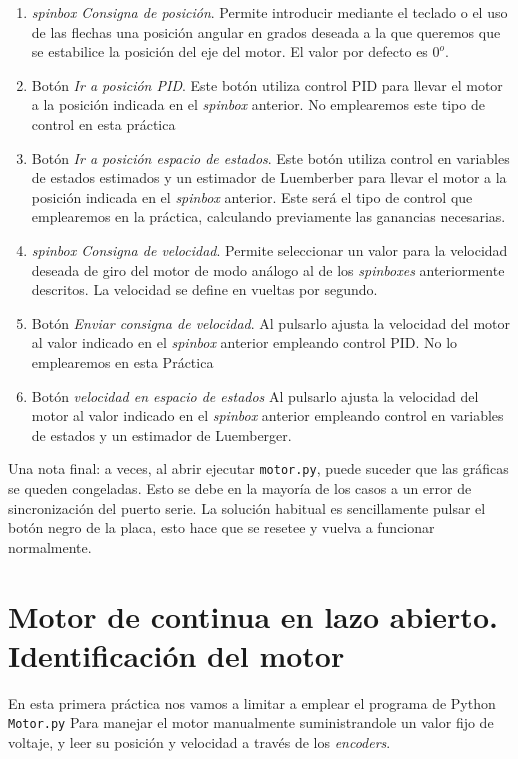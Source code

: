 \documentclass[10pt,a4paper]{report}
\begin{document}
\begin{enumerate}
	\item \emph{spinbox Consigna de posición}. Permite introducir mediante el teclado o el uso de las flechas una posición angular en grados deseada a la que queremos que se estabilice la posición del eje del motor. El valor por defecto es $0^o$.
	\item Botón \emph{Ir a posición PID}. Este botón utiliza control PID para llevar el motor a la posición indicada en el \emph{spinbox} anterior. No emplearemos este tipo de control en esta práctica
	\item Botón \emph{Ir a posición espacio de estados}. Este botón utiliza control en variables de estados estimados y un estimador de Luemberber para llevar el motor a la posición indicada en el \emph{spinbox} anterior. Este será el tipo de control que emplearemos en la práctica, calculando previamente las ganancias necesarias.
	\item \emph{spinbox Consigna de velocidad}. Permite seleccionar un valor para la velocidad deseada de giro del motor de modo análogo al de los \emph{spinboxes} anteriormente descritos. La velocidad se define en vueltas por segundo.
	\item Botón \emph{Enviar consigna de velocidad}. Al pulsarlo ajusta la velocidad del motor al valor indicado en el \emph{spinbox} anterior empleando control PID. No lo emplearemos en esta Práctica
	\item Botón \emph{velocidad en espacio de estados} Al pulsarlo ajusta la velocidad del motor al valor indicado en el \emph{spinbox} anterior empleando control en variables de estados y un estimador de Luemberger.
\end{enumerate}

Una nota final:  a veces, al abrir ejecutar \texttt{motor.py}, puede suceder que las gráficas se queden congeladas. Esto se debe en la mayoría de los casos a un error de sincronización del puerto serie. La solución habitual es sencillamente pulsar el botón negro de la placa, esto hace que se resetee y vuelva a funcionar normalmente.

\chapter{Motor de continua en lazo abierto. Identificación del motor}
En esta primera práctica nos vamos a limitar a emplear el programa de Python \texttt{Motor.py}  Para manejar el motor manualmente suministrandole un valor fijo de voltaje, y leer su posición y velocidad a través de los \emph{encoders}.
\end{document}
